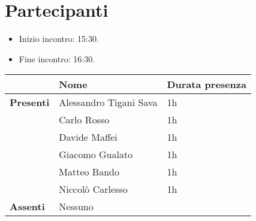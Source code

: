 \section{Partecipanti}

\begin{itemize}
    \item Inizio incontro: 15:30.
    \item Fine incontro: 16:30.
\end{itemize}


\begin{center}
{\renewcommand{\arraystretch}{1.5}
\begin{tabular}{lll}
	                    & \textbf{Nome}  & \textbf{Durata presenza} \\
	\hline
	\textbf{Presenti}   & Alessandro Tigani Sava	& 1h	\\  
						& Carlo Rosso  				& 1h	\\
						& Davide Maffei          	& 1h	\\ 
						& Giacomo Gualato 			& 1h 	\\
						& Matteo Bando           	& 1h	\\   
						& Niccolò Carlesso 			& 1h 	\\  
	\hline
	\textbf{Assenti}	& Nessuno      				&      	\\
\end{tabular}	
}
\end{center}